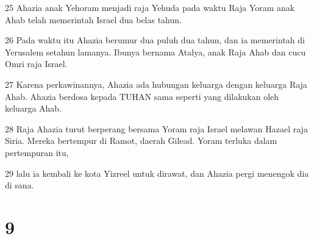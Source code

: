 \par 25 Ahazia anak Yehoram menjadi raja Yehuda pada waktu Raja Yoram anak Ahab telah memerintah Israel dua belas tahun.
\par 26 Pada waktu itu Ahazia berumur dua puluh dua tahun, dan ia memerintah di Yerusalem setahun lamanya. Ibunya bernama Atalya, anak Raja Ahab dan cucu Omri raja Israel.
\par 27 Karena perkawinannya, Ahazia ada hubungan keluarga dengan keluarga Raja Ahab. Ahazia berdosa kepada TUHAN sama seperti yang dilakukan oleh keluarga Ahab.
\par 28 Raja Ahazia turut berperang bersama Yoram raja Israel melawan Hazael raja Siria. Mereka bertempur di Ramot, daerah Gilead. Yoram terluka dalam pertempuran itu,
\par 29 lalu ia kembali ke kota Yizreel untuk dirawat, dan Ahazia pergi menengok dia di sana.

\chapter{9}

